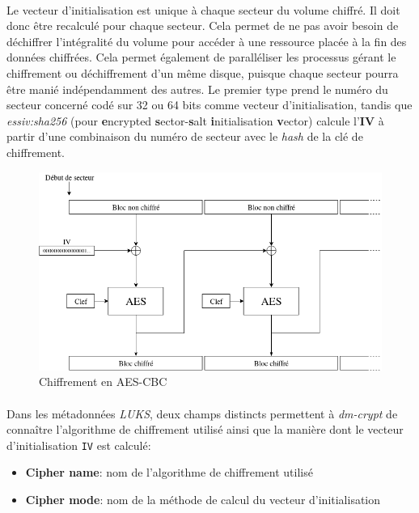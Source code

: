 \paragraph{}
Le vecteur d'initialisation est unique à chaque secteur du volume chiffré. Il
doit donc être recalculé pour chaque secteur. Cela permet de ne pas avoir besoin
de déchiffrer l'intégralité du volume pour accéder à une ressource placée à la
fin des données chiffrées. Cela permet également de paralléliser les processus
gérant le chiffrement ou déchiffrement d'un même disque, puisque chaque secteur
pourra être manié indépendamment des autres. Le premier type prend le numéro du
secteur concerné codé sur 32 ou 64 bits comme vecteur d'initialisation, tandis
que \textit{essiv:sha256} (pour \textbf{e}ncrypted \textbf{s}ector-\textbf{s}alt
\textbf{i}nitialisation \textbf{v}ector) calcule l'\textbf{IV} à partir d'une
combinaison du numéro de secteur avec le \textit{hash} de la clé de chiffrement.
\begin{figure}[h]
  \centering
  \includegraphics[width=.9\linewidth]{choix_developpement/aes_cbc.png}
  \caption{\label{fig:aes_cbc}Chiffrement en AES-CBC}
\end{figure}
\paragraph{}
Dans les métadonnées \textit{LUKS}, deux champs distincts permettent à
\textit{dm-crypt} de connaître l'algorithme de chiffrement utilisé ainsi que la
manière dont le vecteur d'initialisation \texttt{IV} est calculé:
\begin{itemize}
\item \textbf{Cipher name}: nom de l'algorithme de chiffrement utilisé
\item \textbf{Cipher mode}: nom de la méthode de calcul du vecteur
  d'initialisation
\end{itemize}
